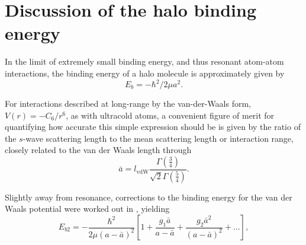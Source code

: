 \section{Discussion of the halo binding energy} \label{sec:lowE_alt}


In the limit of extremely small binding energy, and thus resonant atom-atom interactions, the binding energy of a halo molecule is approximately given by \cite{kgj06}
\begin{equation} \label{Eq:HaloEnergyNoCorrections}
	E_b=-\hbar^2/2\mu a^2.
\end{equation}


For interactions described at long-range by the van-der-Waals form, $V(r)=-C_6/r^6$, as with ultracold atoms, a convenient figure of merit for quantifying how accurate this simple expression should be is given by the ratio of the $s$-wave scattering length to the mean scattering length or interaction range, closely related to the van der Waals length through \cite{gfl93,cju05}
\begin{equation} \label{Eq:InteractionRangevdW}
  \bar{a}= l_{\mathrm{vdW}}\frac{\Gamma\left(\frac{3}{4}\right)}{\sqrt{2}\Gamma\left(\frac{5}{4}\right)}.
\end{equation}



Slightly away from resonance, corrections to the binding energy for the van der Waals potential were worked out in \cite{gao01,gao04}, yielding
\begin{equation} \label{Eq:BindingEnergyGao}
	E_{b2}=-\frac{\hbar^2}{2\mu(a-\bar{a})^2}\left[1+\frac{g_1\bar{a}}{a-\bar{a}}+\frac{g_2\bar{a}^2}{(a-\bar{a})^2} + ... \right],
\end{equation}


